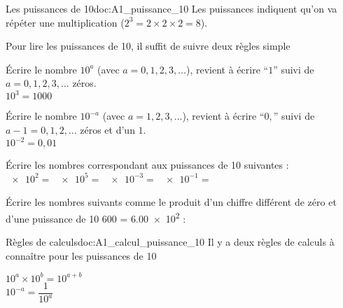 \teteSndMeth

\vspace*{-24pt}



\begin{doc}{Les puissances de 10}{doc:A1_puissance_10}
  Les puissances indiquent qu'on va répéter une multiplication ($2^3 = 2 \times 2 \times 2 = 8$).
  
  Pour lire les puissances de 10, il suffit de suivre deux règles simple
  \begin{encart}
    \pointCyan Écrire le nombre $10^a$ (avec $a = 0, 1, 2, 3, \ldots$), revient à écrire ``$1$'' suivi de $a = 0, 1, 2, 3, \ldots$ zéros. \\
    \exemple $10^3 = 1000$

    \pointCyan Écrire le nombre $10^{-a}$ (avec $a = 1, 2, 3, \ldots$), revient à écrire ``$0,$'' suivi de $a - 1 = 0, 1, 2, \ldots$ zéros et d'un $1$. \\
    \exemple $10^{-2} = 0,\!01$
  \end{encart}
\end{doc}


\numeroQuestion Écrire les nombres correspondant aux puissances de 10 suivantes : \\
$\num{e2} =$  \qq{}
$\num{e5} = $  \qq{}
$\num{e-3} =$  \qq{}
$\num{e-1} =$ 

\numeroQuestion Écrire les nombres suivants comme le produit d'un chiffre différent de zéro et d'une puissance de 10 \exemple \num{600} = \num{6,00e2} : \\


\begin{doc}{Règles de calculs}{doc:A1_calcul_puissance_10}
  Il y a deux règles de calculs à connaître pour les puissances de 10
  \begin{encart}
    \pointCyan $10^a \times 10^b = 10^{a + b}$ \\   
    \pointCyan $10^{-a} = \dfrac{1}{10^a}$
  \end{encart}
\end{doc}


